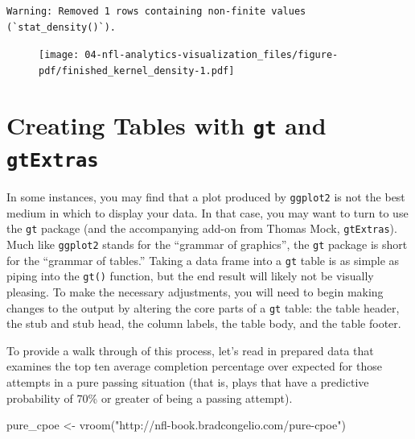 \documentclass[
  letterpaper,
]{krantz}
\newenvironment{Shaded}{\begin{snugshade}}{\end{snugshade}}
\newcommand{\FunctionTok}[1]{\textcolor[rgb]{0.28,0.35,0.67}{#1}}
\newcommand{\NormalTok}[1]{\textcolor[rgb]{0.00,0.23,0.31}{#1}}
\newcommand{\OtherTok}[1]{\textcolor[rgb]{0.00,0.23,0.31}{#1}}
\newcommand{\StringTok}[1]{\textcolor[rgb]{0.13,0.47,0.30}{#1}}
\begin{document}
\begin{verbatim}
Warning: Removed 1 rows containing non-finite values (`stat_density()`).
\end{verbatim}

\begin{figure}[H]

{\centering \texttt{[image: 04-nfl-analytics-visualization\_files/figure-pdf/finished\_kernel\_density-1.pdf]}

}

\end{figure}

\hypertarget{creating-tables-with-gt-and-gtextras}{%
\section{\texorpdfstring{Creating Tables with \texttt{gt} and
\texttt{gtExtras}}{Creating Tables with gt and gtExtras}}\label{creating-tables-with-gt-and-gtextras}}

In some instances, you may find that a plot produced by \texttt{ggplot2}
is not the best medium in which to display your data. In that case, you
may want to turn to use the \texttt{gt} package (and the accompanying
add-on from Thomas Mock, \texttt{gtExtras}). Much like \texttt{ggplot2}
stands for the ``grammar of graphics'', the \texttt{gt} package is short
for the ``grammar of tables.'' Taking a data frame into a \texttt{gt}
table is as simple as piping into the \texttt{gt()} function, but the
end result will likely not be visually pleasing. To make the necessary
adjustments, you will need to begin making changes to the output by
altering the core parts of a \texttt{gt} table: the table header, the
stub and stub head, the column labels, the table body, and the table
footer.

To provide a walk through of this process, let's read in prepared data
that examines the top ten average completion percentage over expected
for those attempts in a pure passing situation (that is, plays that have
a predictive probability of 70\% or greater of being a passing attempt).

\begin{Shaded}
\begin{Highlighting}[]
\NormalTok{pure\_cpoe }\OtherTok{\textless{}{-}} \FunctionTok{vroom}\NormalTok{(}\StringTok{"http://nfl{-}book.bradcongelio.com/pure{-}cpoe"}\NormalTok{)}
\end{Highlighting}
\end{Shaded}
\end{document}
